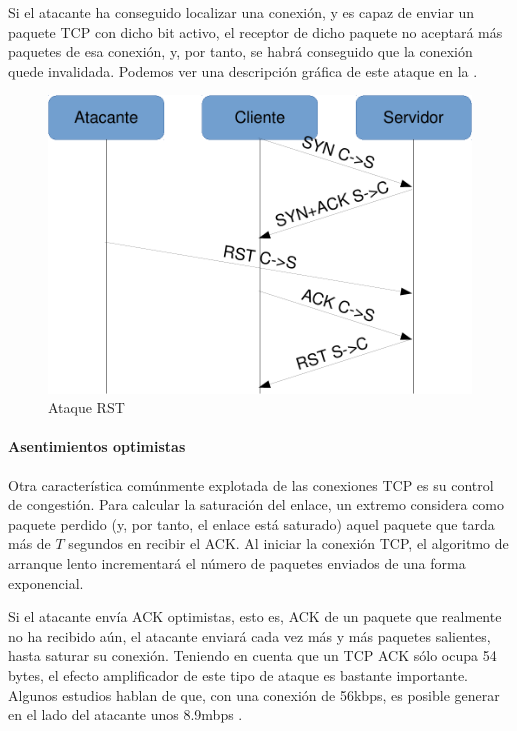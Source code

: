 Si el atacante ha conseguido localizar una conexión, y es capaz de enviar un paquete \gls{TCP} con dicho bit activo, el 
receptor de dicho paquete no aceptará más paquetes de esa conexión, y, por tanto, se habrá conseguido que la conexión 
quede invalidada. Podemos ver una descripción gráfica de este ataque en la .

\begin{figure}[htbp]
\centering
\includegraphics[width=.8\textwidth]{CapituloDDoS/Figuras/RST_attack}
\caption{Ataque RST}
\end{figure}
%

\paragraph{Asentimientos optimistas}\mbox{\newline}

Otra característica comúnmente explotada de las conexiones \gls{TCP} es su control de congestión. Para calcular la saturación del enlace, un extremo considera como paquete perdido (y, por tanto, el 
enlace está saturado) aquel paquete que tarda más de $T$ segundos en recibir el ACK. Al iniciar la conexión \gls{TCP}, el 
algoritmo de arranque lento incrementará el número de paquetes enviados de una forma exponencial.

Si el atacante envía \gls{ACK} optimistas, esto es, \gls{ACK} de un paquete que realmente no ha recibido aún, el atacante enviará 
cada vez más y más paquetes salientes, hasta saturar su conexión. Teniendo en cuenta que un \gls{TCP} \gls{ACK} sólo ocupa 54 
bytes, el efecto amplificador de este tipo de ataque es bastante importante. Algunos estudios hablan de que, con una 
conexión de 56kbps, es posible generar en el lado del atacante unos 8.9mbps \cite{sherwood}.

